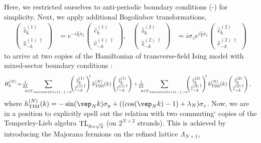 \documentclass[a4paper, 11pt]{article}
\newcommand{\textb}{\textcolor{blue}}
\DeclareMathOperator{\1}{\mathds{1}}
\DeclareMathOperator{\TL}{\textup{TL}}
\DeclareMathOperator{\TIM}{\textup{TIM}}
\begin{document}
Here, we restricted ourselves to anti-periodic boundary conditions (\textb{-}) for simplicity. Next, we apply additional Bogoliubov transformations,
\begin{align}
\begin{pmatrix} \hat{z}^{(1)}_{k} \\ \hat{z}^{(1)\!\ \dag}_{-k} \end{pmatrix} & = e^{-i\frac{\pi}{4}\sigma_{x}} \begin{pmatrix} \hat{c}^{(1)}_{k} \\ \hat{c}^{(1)\!\ \dag}_{-k} \end{pmatrix}, & \begin{pmatrix} \hat{z}^{(2)}_{k} \\ \hat{z}^{(2)\!\ \dag}_{-k} \end{pmatrix} & = i\sigma_{z}e^{i\frac{\pi}{4}\sigma_{x}} \begin{pmatrix} \hat{c}^{(2)}_{k} \\ \hat{c}^{(2)\!\ \dag}_{-k} \end{pmatrix}
\end{align}
to arrive at two copies of the Hamiltonian of transverse-field Ising model with mixed-sector boundary conditions \cite{SchuetzDualityTwistedBoundary}:
\begin{align}
\label{eq:isingham2}
H^{(N)}_{0} & \!=\!\tfrac{1}{2L}\!\!\!\!\!\sum_{k\in\Gamma_{\textb{-},>0}} \!\!\!\begin{pmatrix} \hat{z}^{(1)}_{k} \\ \hat{z}^{(1)\!\ \dag}_{-k} \end{pmatrix}^{\!\!\dagger} h^{(N)}_{\TIM}(k) \begin{pmatrix} \hat{z}^{(1)}_{k} \\ \hat{z}^{(1)\!\ \dag}_{-k} \end{pmatrix}+\!\tfrac{1}{2L}\!\!\!\!\!\sum_{k\in\Gamma_{\textb{-},>0}} \!\!\!\begin{pmatrix} \hat{z}^{(2)}_{k} \\ \hat{z}^{(2)\!\ \dag}_{-k} \end{pmatrix}^{\!\!\dagger} h^{(N)}_{\TIM}(k) \begin{pmatrix} \hat{z}^{(2)}_{k} \\ \hat{z}^{(2)\!\ \dag}_{-k} \end{pmatrix},
\end{align}
where $h^{(N)}_{\TIM}(k) = -\sin(\vep_{N}k)\sigma_{y}+((\cos(\vep_{N}k)-1)+\lambda_{N})\sigma_{z}$. Now, we are in a position to explicitly spell out the relation with two commuting` copies of the Temperley-Lieb algebra $\TL_{\delta=\sqrt{2}}$ (on $2^{N+2}$ strands). This is achieved by introducing the Majorana fermions on the refined lattice $\Lambda_{N+1}$,
\end{document}
